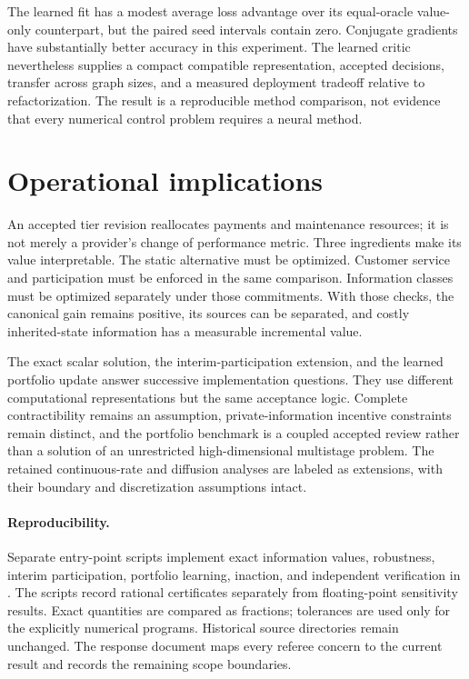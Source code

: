 The learned fit has a modest average loss advantage over its equal-oracle value-only counterpart, but the paired seed intervals contain zero. Conjugate gradients have substantially better accuracy in this experiment. The learned critic nevertheless supplies a compact compatible representation, accepted decisions, transfer across graph sizes, and a measured deployment tradeoff relative to refactorization. The result is a reproducible method comparison, not evidence that every numerical control problem requires a neural method.

\section{Operational implications}
An accepted tier revision reallocates payments and maintenance resources; it is not merely a provider's change of performance metric. Three ingredients make its value interpretable. The static alternative must be optimized. Customer service and participation must be enforced in the same comparison. Information classes must be optimized separately under those commitments. With those checks, the canonical gain remains positive, its sources can be separated, and costly inherited-state information has a measurable incremental value.

The exact scalar solution, the interim-participation extension, and the learned portfolio update answer successive implementation questions. They use different computational representations but the same acceptance logic. Complete contractibility remains an assumption, private-information incentive constraints remain distinct, and the portfolio benchmark is a coupled accepted review rather than a solution of an unrestricted high-dimensional multistage problem. The retained continuous-rate and diffusion analyses are labeled as extensions, with their boundary and discretization assumptions intact.

\paragraph{Reproducibility.}
Separate entry-point scripts implement exact information values, robustness, interim participation, portfolio learning, inaction, and independent verification in . The scripts record rational certificates separately from floating-point sensitivity results. Exact quantities are compared as fractions; tolerances are used only for the explicitly numerical programs. Historical source directories remain unchanged. The response document maps every referee concern to the current result and records the remaining scope boundaries.
